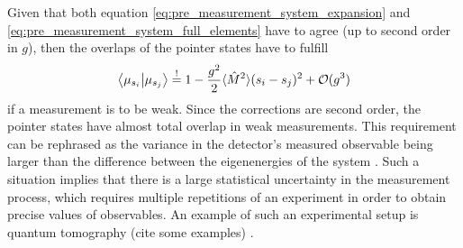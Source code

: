 \documentclass{article}
\newcommand\sj[1]{ {\color{orange} #1} }
\begin{document}
Given that both equation \eqref{eq:pre_measurement_system_expansion} and \eqref{eq:pre_measurement_system_full_elements} have to agree (up to second order in $g$), then the overlaps of the 
pointer states have to fulfill
\begin{align}\label{eq:overlap_condition}
    \bra{\mu_{s_i}}\ket{\mu_{s_j}} \overset{!}{=} 1 - \frac{g^2}{2} \langle \hat{M}^2\rangle (s_i - s_j)^2 + \mathcal{O}(g^3)
\end{align}
if a measurement is to be weak. Since the corrections are second order, the pointer states have almost 
total overlap in weak measurements. 
This requirement can be rephrased as the variance in the detector's 
measured observable being larger than the difference between the eigenenergies of the system \cite{tamirWeakMeasurements2013}. 
Such a situation implies
that there is a large statistical uncertainty in the measurement process, which requires multiple repetitions of an experiment in order to obtain precise values of observables. An example of such an experimental setup is quantum tomography \sj{(cite some examples)}.
\end{document}
